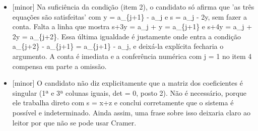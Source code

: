 \documentclass{article}%
\begin{document}
\begin{itemize}%
\item%
{[}minor{]} Na suficiência da condição (item 2), o candidato só afirma que 'as três equações são satisfeitas' com y = a\_\{j+1\} - a\_j e s = a\_j - 2y, sem fazer a conta. Falta a linha que mostra s+3y = a\_j + y = a\_\{j+1\} e s+4y = a\_j + 2y = a\_\{j+2\}. Essa última igualdade é justamente onde entra a condição a\_\{j+2\} - a\_\{j+1\} = a\_\{j+1\} - a\_j, e deixá{-}la explícita fecharia o argumento. A conta é imediata e a conferência numérica com j = 1 no item 4 compensa em parte a omissão.%
\item%
{[}minor{]} O candidato não diz explicitamente que a matriz dos coeficientes é singular (1ª e 3ª colunas iguais, det = 0, posto 2). Não é necessário, porque ele trabalha direto com s = x+z e conclui corretamente que o sistema é possível e indeterminado. Ainda assim, uma frase sobre isso deixaria claro ao leitor por que não se pode usar Cramer.%
\end{itemize}%
\end{document}
